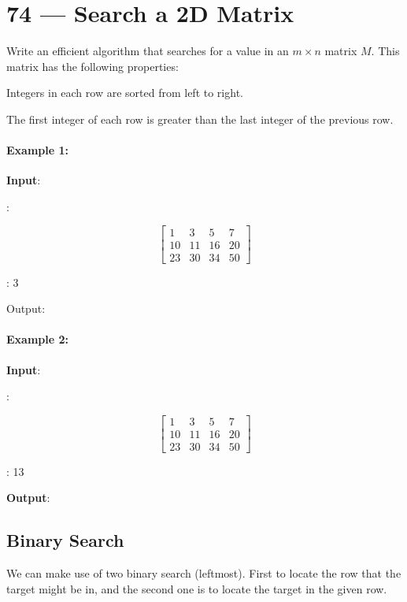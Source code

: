 \section{74 --- Search a 2D Matrix}
Write an efficient algorithm that searches for a value in an $m \times n$ matrix $M$. This matrix has the following properties:

Integers in each row are sorted from left to right.

The first integer of each row is greater than the last integer of the previous row.

\paragraph{Example 1:}
\begin{flushleft}


\textbf{Input}:

:

\[
\begin{bmatrix}
1  &  3 &   5 &   7\\
10 &  11 &  16 &  20\\
23 &  30 &  34 &  50
\end{bmatrix}
\]

: 3

Output: 

\end{flushleft}

\paragraph{Example 2:}
\begin{flushleft}

\textbf{Input}:

:

\[
\begin{bmatrix}
1 &    3 &   5 &   7\\
10 &  11 &  16 &  20\\
23 &  30 &  34 &  50
\end{bmatrix}
\]

: 13

\textbf{Output}: 

\end{flushleft}

\subsection{Binary Search}
We can make use of two binary search (leftmost). First to locate the row that the target might be in, and the second one is to locate the target in the given row.

